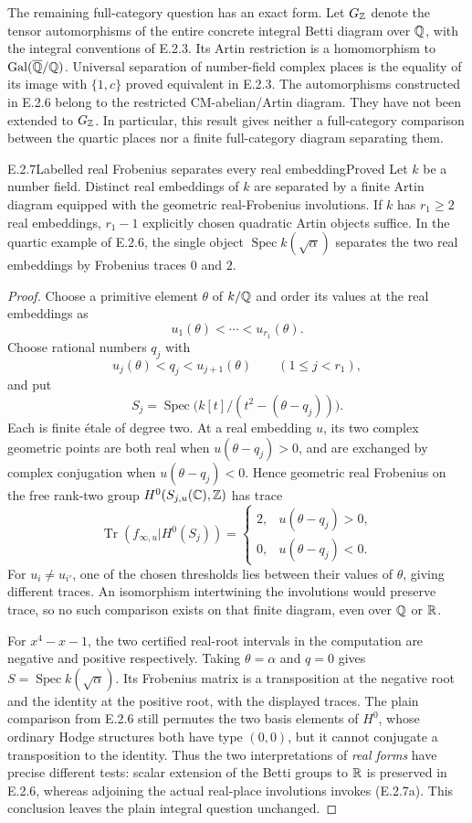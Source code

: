 The remaining full-category question has an exact form. Let $G_{\mathbb Z}$ denote the tensor automorphisms of the entire concrete integral Betti diagram over $\mathbb Q$, with the integral conventions of E.2.3. Its Artin restriction is a homomorphism to $\operatorname{Gal}(\overline{\mathbb Q}/\mathbb Q)$. Universal separation of number-field complex places is the equality of its image with $\{1,c\}$ proved equivalent in E.2.3. The automorphisms constructed in E.2.6 belong to the restricted CM-abelian/Artin diagram. They have not been extended to $G_{\mathbb Z}$. In particular, this result gives neither a full-category comparison between the quartic places nor a finite full-category diagram separating them.

\begin{result}{E.2.7}{Labelled real Frobenius separates every real embedding}{Proved}
Let $k$ be a number field. Distinct real embeddings of $k$ are separated by a finite Artin diagram equipped with the geometric real-Frobenius involutions. If $k$ has $r_1\ge2$ real embeddings, $r_1-1$ explicitly chosen quadratic Artin objects suffice. In the quartic example of E.2.6, the single object $\operatorname{Spec}k(\sqrt{\alpha})$ separates the two real embeddings by Frobenius traces $0$ and $2$.
\end{result}
\begin{proof}
Choose a primitive element $\theta$ of $k/\mathbb Q$ and order its values at the real embeddings as
\[
 u_1(\theta)<\cdots<u_{r_1}(\theta).
\]
Choose rational numbers $q_j$ with
\[
 u_j(\theta)<q_j<u_{j+1}(\theta)
                         \qquad(1\le j<r_1),
\]
and put
\[
 S_j=\operatorname{Spec}\bigl(k[t]/(t^2-(\theta-q_j))\bigr).
\]
Each is finite \'etale of degree two. At a real embedding $u$, its two complex geometric points are both real when $u(\theta-q_j)>0$, and are exchanged by complex conjugation when $u(\theta-q_j)<0$. Hence geometric real Frobenius on the free rank-two group $H^0(S_{j,u}(\mathbb C),\mathbb Z)$ has trace
\[
 \operatorname{Tr}(f_{\infty,u}|H^0(S_j))=
 \begin{cases}
 2,&u(\theta-q_j)>0,\\
 0,&u(\theta-q_j)<0.
 \end{cases}
 \tag{E.2.7a}
\]
For $u_i\ne u_{i'}$, one of the chosen thresholds lies between their values of $\theta$, giving different traces. An isomorphism intertwining the involutions would preserve trace, so no such comparison exists on that finite diagram, even over $\mathbb Q$ or $\mathbb R$.

For $x^4-x-1$, the two certified real-root intervals in the computation are negative and positive respectively. Taking $\theta=\alpha$ and $q=0$ gives $S=\operatorname{Spec}k(\sqrt{\alpha})$. Its Frobenius matrix is a transposition at the negative root and the identity at the positive root, with the displayed traces. The plain comparison from E.2.6 still permutes the two basis elements of $H^0$, whose ordinary Hodge structures both have type $(0,0)$, but it cannot conjugate a transposition to the identity. Thus the two interpretations of \emph{real forms} have precise different tests: scalar extension of the Betti groups to $\mathbb R$ is preserved in E.2.6, whereas adjoining the actual real-place involutions invokes (E.2.7a). This conclusion leaves the plain integral question unchanged.
\end{proof}


